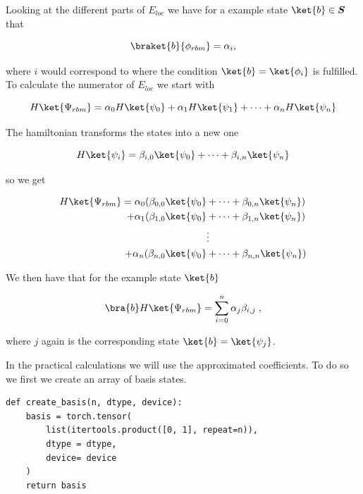 Looking at the different parts of $E_{loc}$ we have for a example state $\ket{b} \in \boldsymbol{S}$ that

\begin{equation}
  \braket{b}{\phi_{rbm}} = \alpha_i ,
\end{equation}

where $i$ would correspond to where the condition $\ket{b} = \ket{\phi_i}$ is fulfilled. To calculate the numerator of $E_{loc}$ we start with

\begin{equation}
  H\ket{\Psi_{rbm}} =  \alpha_0H\ket{\psi_0} + \alpha_1H\ket{\psi_1} + \dots + \alpha_nH\ket{\psi_n}
\end{equation}

The hamiltonian transforms the states into a new one

\begin{equation}
  H\ket{\psi_i} = \beta_{i,0}\ket{\psi_0} + \dots + \beta_{i,n}\ket{\psi_n}
\end{equation}

so we get

\begin{align}
  H\ket{\Psi_{rbm}} = \alpha_0  ( \beta_{0,0}\ket{\psi_0} &+ \dots + \beta_{0,n}\ket{\psi_n}  ) \\
 + \alpha_1  ( \beta_{1,0}\ket{\psi_0} &+ \dots + \beta_{1,n}\ket{\psi_n}  ) \\
&\vdots \\
+ \alpha_n  ( \beta_{n,0}\ket{\psi_0} &+ \dots + \beta_{n,n}\ket{\psi_n}  ) 
\end{align}

We then have that for the example state $\ket{b}$

\begin{equation}
  \bra{b}H\ket{\Psi_{rbm}} = \sum_{i=0}^n \alpha_j\beta_{i,j} \; ,
\end{equation}

where $j$ again is the corresponding state $\ket{b} = \ket{\psi_j}$.

In the practical calculations we will use the approximated coefficients. To do so we first we create an array of basis states.

\begin{verbatim}
def create_basis(n, dtype, device):
    basis = torch.tensor(
        list(itertools.product([0, 1], repeat=n)),
        dtype = dtype,
        device= device
    )
    return basis
\end{verbatim}

